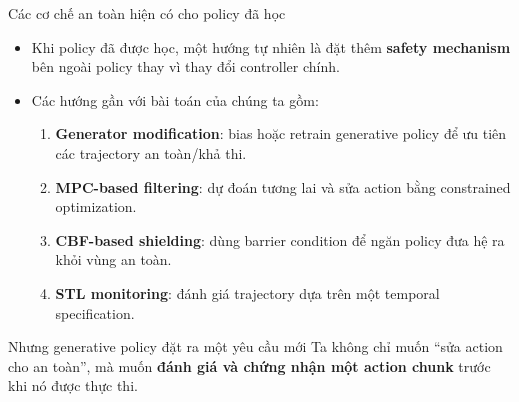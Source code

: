 \documentclass[aspectratio=169]{beamer}
\begin{document}
\begin{frame}[t,shrink=8]{Các cơ chế an toàn hiện có cho policy đã học}

\begin{itemize}
    \item Khi policy đã được học, một hướng tự nhiên là đặt thêm
    \textbf{safety mechanism} bên ngoài policy thay vì thay đổi controller
    chính.

    \vspace{4pt}

    \item Các hướng gần với bài toán của chúng ta gồm:

    \begin{enumerate}
        \item \textbf{Generator modification}:
        bias hoặc retrain generative policy để ưu tiên các trajectory
        an toàn/khả thi.

        \item \textbf{MPC-based filtering}:
        dự đoán tương lai và sửa action bằng constrained optimization.

        \item \textbf{CBF-based shielding}:
        dùng barrier condition để ngăn policy đưa hệ ra khỏi vùng an toàn.

        \item \textbf{STL monitoring}:
        đánh giá trajectory dựa trên một temporal specification.
    \end{enumerate}

\end{itemize}

\vspace{5pt}

\begin{alertblock}{Nhưng generative policy đặt ra một yêu cầu mới}
Ta không chỉ muốn ``sửa action cho an toàn'', mà muốn
\textbf{đánh giá và chứng nhận một action chunk} trước khi nó được thực thi.
\end{alertblock}
\end{frame}

\end{document}
